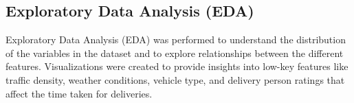 \documentclass[10pt,twocolumn,letterpaper]{article}
\begin{document}



    \subsection{Exploratory Data Analysis (EDA)}
        Exploratory Data Analysis (EDA) was performed to understand the distribution of the variables in the dataset and to explore relationships between the different features. Visualizations were created to provide insights into low-key features like traffic density, weather conditions, vehicle type, and delivery person ratings that affect the time taken for deliveries.
\end{document}
